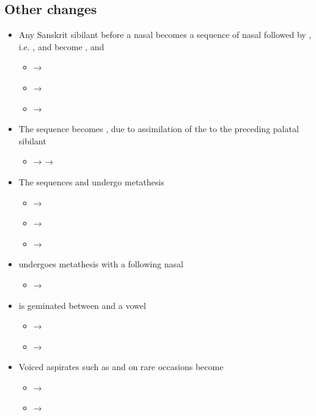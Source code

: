 \subsection{Other changes}

\begin{itemize}
	\item Any Sanskrit sibilant before a nasal becomes a sequence of nasal followed by , i.e. , and  become , and 
		\begin{itemize}
			\item {} → 
			\item {} → 
			\item {} → 
	\end{itemize}
\item The sequence  becomes , due to assimilation of the  to the preceding palatal sibilant
		\begin{itemize}
			\item {} →  → 
		\end{itemize}
	\item The sequences  and  undergo metathesis
		\begin{itemize}
			\item {} → 
			\item {} → 
			\item {} → 
		\end{itemize}
	\item {} undergoes metathesis with a following nasal
		\begin{itemize}
			\item {} → 
		\end{itemize}
	\item {} is geminated between  and a vowel
		\begin{itemize}
			\item {} → 
			\item {} → 
		\end{itemize}
	\item Voiced aspirates such as  and  on rare occasions become 
		\begin{itemize}
			\item {} → 
			\item {} → 

\end{itemize}
\end{itemize}
